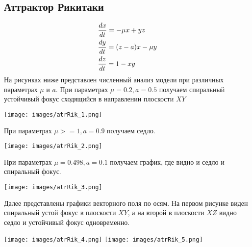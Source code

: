 \subsection{Аттрактор Рикитаки}
\begin{align}
  &\dfrac{d x}{dt} = -\mu x+yz \notag\\
  &\dfrac{d y}{dt} = (z-a)x-\mu y\\
  &\dfrac{d z}{dt} = 1-xy\notag
\end{align}
На рисунках ниже представлен численный анализ модели при различных параметрах $\mu$ и $a$.
При параметрах $\mu=0.2,a=0.5$ получаем спиральный устойчивый фокус сходящийся в направлении плоскости $XY$
\begin{center}
  \texttt{[image: images/atrRik\_1.png]}
\end{center}
При параметрах $\mu>=1,a=0.9$ получаем седло.
\begin{center}
  \texttt{[image: images/atrRik\_2.png]}
\end{center}
При параметрах $\mu=0.498,a=0.1$ получаем график, где видно и седло и спиральный фокус.
\begin{center}
  \texttt{[image: images/atrRik\_3.png]}
\end{center}
Далее представлены графики векторного поля по осям. На первом рисунке виден спиральный устой фокус в плоскости $XY$, а на второй в плоскости $XZ$ видно седло и устойчивый фокус одновременно.
\begin{center}
  \texttt{[image: images/atrRik\_4.png]}
  \texttt{[image: images/atrRik\_5.png]}
\end{center}

% 
